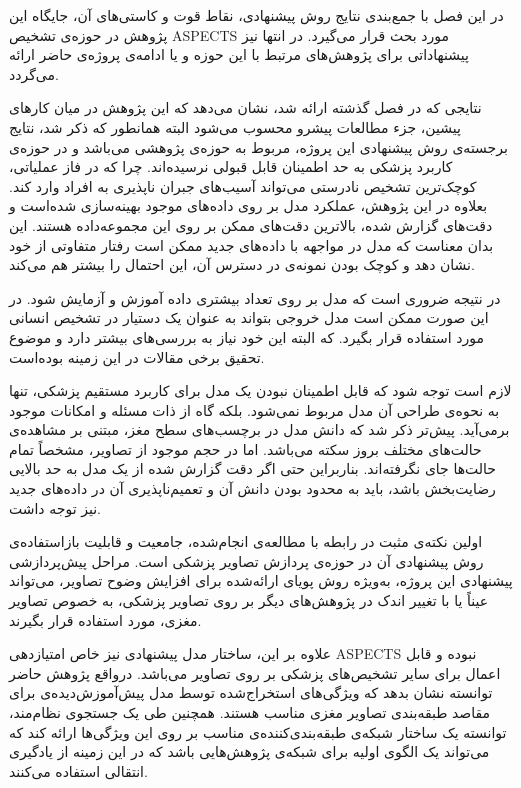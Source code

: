 

در این فصل با جمع‌بندی نتایج روش پیشنهادی، نقاط قوت و کاستی‌های آن، جایگاه این پژوهش در حوزه‌ی تشخیص ASPECTS 
مورد بحث قرار می‌گیرد.
در انتها نیز پیشنهاداتی برای پژوهش‌های مرتبط با این حوزه و یا ادامه‌ی پروژه‌ی حاضر ارائه می‌گردد. 



نتایجی که در فصل گذشته ارائه شد، نشان می‌دهد که این پژوهش در میان کارهای پیشین، جزء مطالعات پیشرو محسوب می‌شود
البته همانطور که ذکر شد، نتایج برجسته‌ی روش پیشنهادی این پروژه، مربوط به حوزه‌ی پژوهشی می‌باشد و در حوزه‌ی کاربرد پزشکی
به حد اطمینان قابل قبولی نرسیده‌اند.
چرا که در فاز عملیاتی، کوچک‌ترین تشخیص نادرستی می‌تواند آسیب‌های جبران ناپذیری به افراد وارد کند.
بعلاوه در این پژوهش، عملکرد مدل بر روی داده‌های موجود بهینه‌سازی شده‌است و دقت‌های گزارش شده، بالاترین دقت‌های ممکن بر روی این مجموعه‌داده هستند.
این بدان معناست که مدل در مواجهه با داده‌های جدید ممکن است رفتار متفاوتی از خود نشان دهد و کوچک بودن نمونه‌ی در دسترس آن، این احتمال را بیشتر هم می‌کند.

در نتیجه ضروری است که مدل بر روی تعداد بیشتری داده آموزش و آزمایش شود.
در این صورت ممکن است مدل خروجی بتواند به عنوان یک دستیار در تشخیص انسانی مورد استفاده قرار بگیرد.
که البته این خود نیاز به بررسی‌های بیشتر دارد و موضوع تحقیق برخی مقالات در این زمینه بوده‌است.

لازم است توجه شود که قابل اطمینان نبودن یک مدل برای کاربرد مستقیم پزشکی، تنها به نحوه‌ی طراحی آن مدل مربوط نمی‌شود.
بلکه گاه از ذات مسئله و امکانات موجود برمی‌آید.
پیش‌تر ذکر شد که دانش مدل در برچسب‌های سطح مغز، مبتنی بر مشاهده‌ی حالت‌های مختلف بروز سکته می‌باشد.
اما در حجم موجود از تصاویر، مشخصاً تمام حالت‌ها جای نگرفته‌اند.
بناربراین حتی اگر دقت گزارش شده از یک مدل به حد بالایی رضایت‌بخش باشد، باید به محدود بودن دانش آن و 
تعمیم‌ناپذیری آن در داده‌های جدید نیز توجه داشت.


اولین نکته‌ی مثبت در رابطه با مطالعه‌ی انجام‌شده، 
جامعیت و قابلیت بازاستفاده‌ی روش پیشنهادی آن در حوزه‌ی پردازش تصاویر پزشکی است.
مراحل پیش‌پردازشی پیشنهادی این پروژه، به‌ویژه روش پویای ارائه‌شده برای افزایش وضوح تصاویر، می‌تواند عیناً یا با تغییر اندک در پژوهش‌های دیگر بر روی تصاویر پزشکی، به خصوص تصاویر مغزی،
مورد استفاده قرار بگیرند. 

علاوه بر این، 
ساختار مدل پیشنهادی نیز خاص امتیازدهی ASPECTS نبوده و قابل اعمال برای سایر تشخیص‌های پزشکی بر روی تصاویر می‌باشد.
درواقع پژوهش حاضر توانسته نشان بدهد که ویژگی‌های استخراج‌شده توسط مدل پیش‌آموزش‌دیده‌ی  برای مقاصد طبقه‌بندی تصاویر مغزی مناسب هستند.
همچنین طی یک جستجوی نظام‌مند، توانسته یک ساختار شبکه‌ی طبقه‌بندی‌کننده‌ی مناسب بر روی این ویژگی‌ها ارائه کند که می‌تواند یک الگوی اولیه برای شبکه‌ی پژوهش‌هایی باشد که در این زمینه از یادگیری انتقالی استفاده می‌کنند.

